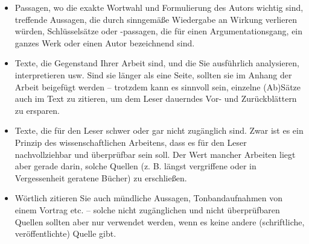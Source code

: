 \documentclass[]{book}
\providecommand{\tightlist}{%
  \setlength{\itemsep}{0pt}\setlength{\parskip}{0pt}}
\theoremstyle{definition}
\theoremstyle{definition}
\theoremstyle{definition}
\theoremstyle{remark}
\begin{document}
\begin{itemize}
\tightlist
\item
  Passagen, wo die exakte Wortwahl und Formulierung des Autors wichtig
  sind, treffende Aussagen, die durch sinngemäße Wiedergabe an Wirkung
  verlieren würden, Schlüsselsätze oder -passagen, die für einen
  Argumentationsgang, ein ganzes Werk oder einen Autor bezeichnend sind.
\item
  Texte, die Gegenstand Ihrer Arbeit sind, und die Sie ausführlich
  analysieren, interpretieren usw. Sind sie länger als eine Seite,
  sollten sie im Anhang der Arbeit beigefügt werden -- trotzdem kann es
  sinnvoll sein, einzelne (Ab)Sätze auch im Text zu zitieren, um dem
  Leser dauerndes Vor- und Zurückblättern zu ersparen.
\item
  Texte, die für den Leser schwer oder gar nicht zugänglich sind. Zwar
  ist es ein Prinzip des wissenschaftlichen Arbeitens, dass es für den
  Leser nachvollziehbar und überprüfbar sein soll. Der Wert mancher
  Arbeiten liegt aber gerade darin, solche Quellen (z. B. längst
  vergriffene oder in Vergessenheit geratene Bücher) zu erschließen.
\item
  Wörtlich zitieren Sie auch mündliche Aussagen, Tonbandaufnahmen von
  einem Vortrag etc. -- solche nicht zugänglichen und nicht
  überprüfbaren Quellen sollten aber nur verwendet werden, wenn es keine
  andere (schriftliche, veröffentlichte) Quelle gibt.
\end{itemize}
\end{document}
